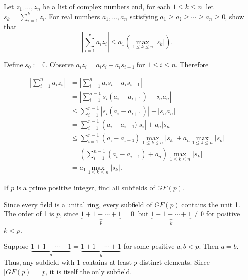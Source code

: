 \begin{problem} 
Let $z_1, \dots, z_n$ be a list of complex
numbers and, for each $1 \leq k \leq n$, 
let $s_k = \sum_{i=1}^k z_i$. For real numbers
$a_1, \dots, a_n$ satisfying 
$a_1 \geq a_2 \geq \cdots \geq a_n \geq 0$, 
show that
\begin{equation}
\label{eq:Abels}  
\left| \sum_{i=1}^n a_i z_i \right| 
\leq a_1 \left( \max_{1 \leq k \leq n} |s_k|\right).
\end{equation}
\end{problem}
\smallskip
\begin{solution}

Define $s_0:=0$. Observe $a_iz_i = a_is_i - a_is_{i-1}$ for $1\leq i\leq n$. Therefore


\begin{align*}
\left|\sum_{i=1}^n a_iz_i \right| & = \left|\sum_{i=1}^n  a_i s_i - a_i s_{i-1}\right|\\
&= \left|\sum_{i=1}^{n-1} s_i(a_i-a_{i+1}) + s_n a_n \right|\\
&\leq \sum_{i=1}^{n-1} \left|s_i (a_i-a_{i+1})\right| + \left|s_n a_n\right|  \tag*{by the Triangle Inequality}\\
&= \sum_{i=1}^{n-1} \left(a_i-a_{i+1})|s_i\right| + a_n\left|s_n\right| \\
&\leq \sum_{i=1}^{n-1}(a_i-a_{i+1}) \max_{1 \leq k \leq n} |s_k| +  a_n\max_{1 \leq k \leq n} |s_k| \\
&= \left(\sum_{i=1}^{n-1} (a_i-a_{i+1}) + a_n\right) \max_{1 \leq k \leq n} |s_k| \\
&= a_1 \max_{1 \leq k \leq n}  |s_k|. \tag*{by telescoping sums}
\end{align*}
\end{solution}
\probskip



\begin{problem}[Golan 24]
If $p$ is a prime positive integer, find all subfields of $GF(p)$.
\end{problem}

\begin{solution}
Since every field is a unital ring, every subfield of $GF(p)$ contains the unit 1. The order of 1 is $p$, since $\underbrace{1 + 1 + \cdots + 1}_{p} = 0$, but $\underbrace{1 + 1 + \cdots + 1}_{k} \neq 0$ for positive $k<p$.

Suppose  $\underbrace{1 + 1 + \cdots + 1}_{a} = \underbrace{1 + 1 + \cdots + 1}_{b}$ for some positive $a,b <p$. Then $a=b$. Thus, any subfield with 1 contains at least $p$ distinct elements. Since $|GF(p)|=p$, it is itself the only subfield.

\end{solution}
\newpage

